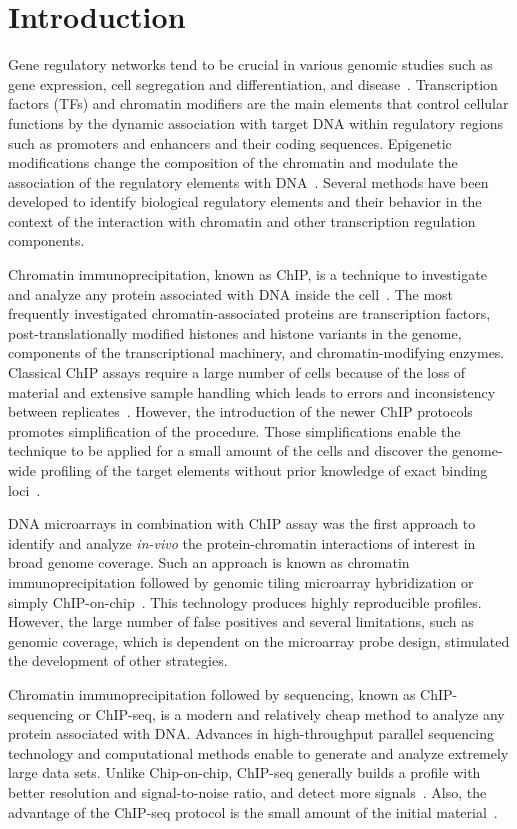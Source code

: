 \chapter*{Introduction}

Gene regulatory networks tend to be crucial in various genomic studies such as gene expression, cell segregation and differentiation, and disease~\cite{collas2010current}. 
Transcription factors (TFs) and chromatin modifiers are the main elements that control cellular functions by the dynamic association with target DNA within regulatory regions such as promoters and enhancers and their coding sequences.
Epigenetic modifications change the composition of the chromatin and modulate the association of the regulatory elements with DNA~\cite{antequera2003structure, kouzarides2007chromatin, mito2007histone}.
Several methods have been developed to identify biological regulatory elements and their behavior in the context of the interaction with chromatin and other transcription regulation components. 

Chromatin immunoprecipitation, known as ChIP, is a technique to investigate and analyze any protein associated with DNA inside the cell~\cite{o1995histone, o1996immunoprecipitation, nelson2006protocol}.
The most frequently investigated chromatin-associated proteins are transcription factors, post-translationally modified histones and histone variants in the genome, components of the transcriptional machinery, and chromatin-modifying enzymes.
Classical ChIP assays require a large number of cells because of the loss of material and extensive sample handling which leads to errors and inconsistency between replicates~\cite{o1996immunoprecipitation}. 
However, the introduction of the newer ChIP protocols promotes simplification of the procedure. 
Those simplifications enable the technique to be applied for a small amount of the cells and discover the genome-wide profiling of the target elements without prior knowledge of exact binding loci~\cite{collas2010current}. 

DNA microarrays in combination with ChIP assay was the first approach to identify and analyze \textit{in-vivo} the protein-chromatin interactions of interest in broad genome coverage. 
Such an approach is known as chromatin immunoprecipitation followed by genomic tiling microarray hybridization or simply ChIP-on-chip~\cite{ren2000genome, loden2005whole}. 
This technology produces highly reproducible profiles.
However, the large number of false positives and several limitations, such as genomic coverage, which is dependent on the microarray probe design, stimulated the development of other strategies. 

Chromatin immunoprecipitation followed by sequencing, known as ChIP-sequencing or ChIP-seq, is a modern and relatively cheap method to analyze any protein associated with DNA. 
Advances in high-throughput parallel sequencing technology and computational methods enable to generate and analyze extremely large data sets. 
Unlike Chip-on-chip, ChIP-seq generally builds a profile with better resolution and signal-to-noise ratio, and detect more signals~\cite{park2009chip}.
Also, the advantage of the ChIP-seq protocol is the small amount of the initial material~\cite{adli2010genome}.